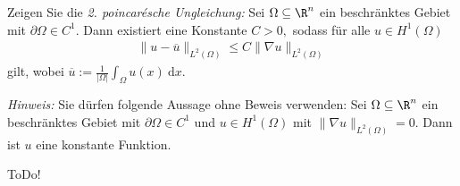 
\begin{exercise}

  Zeigen Sie die \textit{2. poincarésche Ungleichung:} Sei $\Omega \subseteq \R^n$ ein beschränktes Gebiet mit $\partial\Omega \in C^1.$ Dann existiert eine Konstante $C > 0,$ sodass für alle $u \in H^1(\Omega)$
  \begin{align*}
      \| u - \overline{u} \|_{L^2(\Omega)} \leq C \| \nabla u \|_{L^2(\Omega)}
  \end{align*}
  gilt, wobei $\overline{u} := \frac{1}{|\Omega|} \int_\Omega u(x) \mathrm{~d}x$.

  \textit{Hinweis:} Sie dürfen folgende Aussage ohne Beweis verwenden: Sei $\Omega \subseteq \R^n$ ein beschränktes Gebiet mit $\partial\Omega \in C^1$ und $u \in H^1(\Omega)$
  mit $\| \nabla u \|_{L^2(\Omega)} = 0.$ Dann ist $u$ eine konstante Funktion.

\end{exercise}


\begin{solution}

ToDo!

\end{solution}

